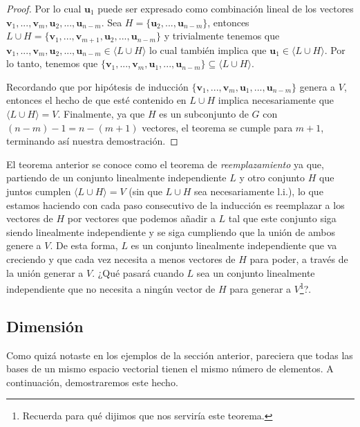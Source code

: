\documentclass[12pt,dvipsnames]{article}
\newenvironment{teorema}[2][Teorema]{\begin{trivlist}
\item[\hskip \labelsep {\bfseries #1}\hskip \labelsep {\bfseries #2.}]}{\end{trivlist}}
\begin{document}
\begin{teorema} {4.1.1}
\begin{proof}
    Por lo cual $\mathbf{u}_1$ puede ser expresado como combinación lineal de los vectores $\mathbf{v}_1,...,\mathbf{v}_m,\mathbf{u}_2,...,\mathbf{u}_{n-m}.$ Sea $H=\{\mathbf{u}_2,...,\mathbf{u}_{n-m}\}$, entonces $L\cup H=\{\mathbf{v}_1,...,\mathbf{v}_{m+1},\mathbf{u}_2,...,\mathbf{u}_{n-m}\}$ y trivialmente tenemos que $\mathbf{v}_1,...,\mathbf{v}_m,\mathbf{u}_2,...,\mathbf{u}_{n-m}\in\langle L\cup H\rangle$ \textemdash lo cual también implica que $\mathbf{u}_1\in\langle L\cup H\rangle$. Por lo tanto, tenemos que $\{\mathbf{v}_1,...,\mathbf{v}_m,\mathbf{u}_1,...,\mathbf{u}_{n-m}\}\subseteq\langle L\cup H\rangle.$

    Recordando que por hipótesis de inducción $\{\mathbf{v}_1,...,\mathbf{v}_m,\mathbf{u}_1,...,\mathbf{u}_{n-m}\}$ genera a $V$, entonces el hecho de que esté contenido en $L\cup H$ implica necesariamente que $\langle L\cup H\rangle=V.$ Finalmente, ya que $H$ es un subconjunto de $G$ con $(n-m)-1=n-(m+1)$ vectores, el teorema se cumple para $m+1$, terminando así nuestra demostración.

    \end{proof}
\end{teorema}

El teorema anterior se conoce como el teorema de \emph{reemplazamiento} ya que, partiendo de un conjunto linealmente independiente $L$ y otro conjunto $H$ que juntos cumplen $\langle L\cup H \rangle=V$ (sin que $L\cup H$ sea necesariamente l.i.), lo que estamos haciendo con cada paso consecutivo de la inducción es reemplazar a los vectores de $H$ por vectores que podemos añadir a $L$ tal que este conjunto siga siendo linealmente independiente y se siga cumpliendo que la unión de ambos genere a $V$. De esta forma, $L$ es un conjunto linealmente independiente que va creciendo y que cada vez necesita a menos vectores de $H$ para poder, a través de la unión generar a $V$. ¿Qué pasará cuando $L$ sea un conjunto linealmente independiente que no necesita a ningún vector de $H$ para generar a $V$\footnote{Recuerda para qué dijimos que nos serviría este teorema.}?. 

\newpage
\subsection{Dimensión} \label{Subsec:Dimensión}

Como quizá notaste en los ejemplos de la sección anterior, pareciera que todas las bases de un mismo espacio vectorial tienen el mismo número de elementos. A continuación, demostraremos este hecho.
\end{document}
